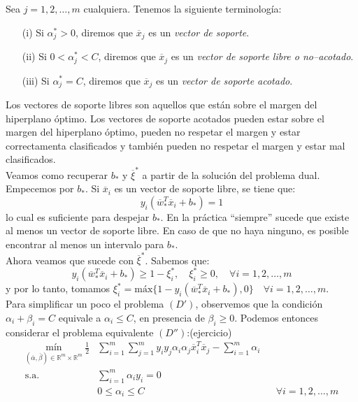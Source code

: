 \documentclass[11pt]{article}
\newcommand{\R}{\mathbb{R}}
\newcommand{\Rm}{\R^{m}}
\newcommand{\xiv}{\overline{\xi}}
\newcommand{\av}{\overline{\alpha}}
\newcommand{\bev}{\overline{\beta}}
\newcommand{\wv}{\overline{w}}
\newcommand{\x}{\overline{x}}
\newcommand{\Sm}{1,2,\ldots, m}
\newcommand{\bo}{b_{*}}
\newcommand{\wo}{\wv_{*}}
\newcommand{\xivo}{\xiv^{*}}
\newcommand{\aljo}{\alpha_{j}^{*}}
\newcommand{\xiio}{\xi_{i}^{*}}
\newcommand{\ali}{\alpha_{i}}
\newcommand{\alj}{\alpha_{j}}
\newcommand{\bei}{\beta_{i}}
\begin{document}
Sea $j=\Sm$ cualquiera. Tenemos la siguiente terminología:
\begin{itemize}
\item[(i)] Si $\aljo>0$, diremos que $\x_{j}$ es un \emph{vector de soporte}.
\item[(ii)] Si $0<\aljo<C$, diremos que $\x_{j}$ es un \emph{vector de soporte libre o no--acotado}.
\item[(iii)] Si $\aljo=C$, diremos que $\x_{j}$ es un \emph{vector de soporte acotado}.
\end{itemize}
Los vectores de soporte libres son aquellos que están sobre el margen del hiperplano óptimo. Los vectores de soporte acotados pueden estar sobre el margen del hiperplano óptimo, pueden no respetar el margen y estar correctamenta clasificados y también pueden no respetar el margen y estar mal clasificados.\\

Veamos como recuperar $\bo$ y $\xivo$ a partir de la solución del problema dual. Empecemos por $\bo$. Si $\x_{i}$ es un vector de soporte libre, se tiene que:
$$y_{i}(\wo^{T}\x_{i}+\bo)=1$$
lo cual es suficiente para despejar $\bo$. En la práctica ``siempre'' sucede que existe al menos un vector de soporte libre. En caso de que no haya ninguno, es posible encontrar al menos un intervalo para $\bo$.\\

Ahora veamos que sucede con $\xivo$. Sabemos que:
$$y_{i}(\wo^{T}\x_{i}+\bo)\geq1-\xiio,\quad \xiio\geq0,\quad \forall i=\Sm$$
y por lo tanto, tomamos $\xiio=\text{máx}\{1-y_{i}(\wo^{T}\x_{i}+\bo), 0\}\quad\forall i=\Sm$.\\

Para simplificar un poco el problema $(D')$, observemos que la condición $\ali+\bei=C$ equivale a $\ali\leq C$, en presencia de $\bei\geq0$. Podemos entonces considerar el problema equivalente $(D'')$:(ejercicio)
\begin{equation*}
\begin{aligned}
\underset{(\av, \bev)\in\Rm\times\Rm}{\text{mín}}\ \frac{1}{2}&\sum_{i=1}^{m}\sum_{j=1}^{m}y_{i}y_{j}\ali\alj\x_{i}^{T}\x_{j}-\sum_{i=1}^{m}\ali \\
\text{s.a.}\ \
& \sum_{i=1}^{m}\ali y_{i}=0\\
& 0\leq\ali\leq C &&\forall i=\Sm\\
\end{aligned}
\end{equation*}
\end{document}
